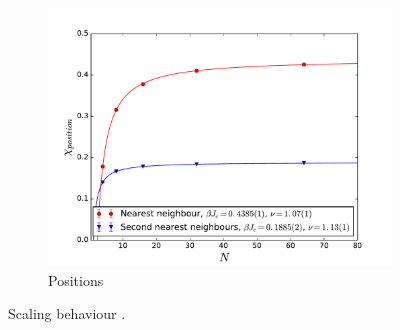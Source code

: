 \documentclass[twoside]{article}
\begin{document}
\begin{figure}[!tpb]
\begin{subfigure}[b]{0.32\textwidth}
    \includegraphics[width=\textwidth]{images/plot_pos.pdf}
    \caption{Positions}
    \label{scaling_pos}
  \end{subfigure}
  \caption{Scaling behaviour .}
  \label{scaling}
\end{figure}
\end{document}
